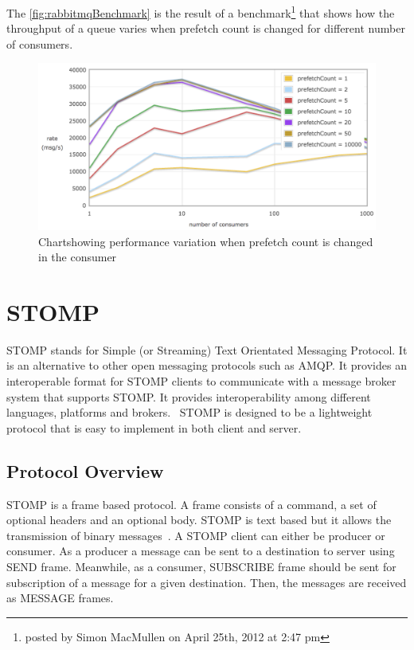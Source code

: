   The \autoref{fig:rabbitmqBenchmark} is the result of a benchmark\footnote{posted by Simon MacMullen on April 25th, 2012 at 2:47 pm} that shows how the throughput of a queue varies when prefetch count is changed for different number of consumers.
\begin{figure}[H]
  \centering
  \includegraphics[width=1\textwidth]{figures/rabbitmqPrefetch}
  \caption[Chart showing performance variation when prefetch count is changed in the consumer]{Chart\footnotemark showing performance variation when prefetch count is changed in the consumer}
  \label{fig:rabbitmqBenchmark}
\end{figure}

\section{STOMP}
\label{sec:stomp}
  STOMP stands for Simple (or Streaming) Text Orientated Messaging Protocol. It is an alternative to other open messaging protocols such as AMQP. It provides an interoperable format for STOMP clients to communicate with a message broker system that supports STOMP. It provides interoperability among different languages, platforms and brokers.~\cite{stomp}
  STOMP is designed to be a lightweight protocol that is easy to implement in both client and server.
  \subsection{Protocol Overview}
  STOMP is a frame based protocol. A frame consists of a command, a set of optional headers and an optional body. STOMP is text based but it allows the transmission of binary messages~\cite{stomp}.
  A STOMP client can either be producer or consumer. As a producer  a message can be sent to a destination to server using SEND frame. Meanwhile, as a consumer, SUBSCRIBE frame should be sent for subscription of a message for a given destination. Then, the messages are received as MESSAGE frames.

